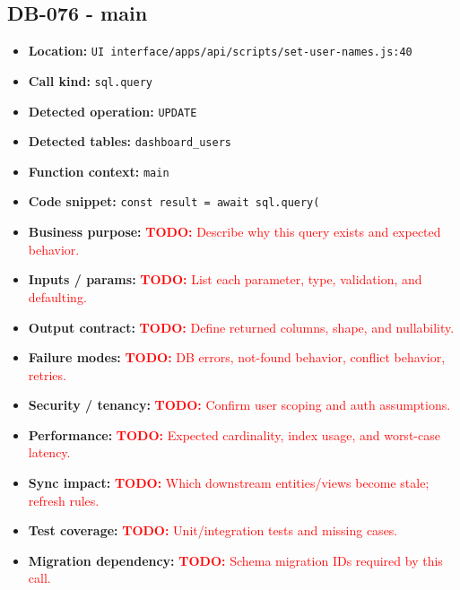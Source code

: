 \documentclass[11pt]{article}
\newcommand{\todoitem}[1]{\textcolor{red}{\textbf{TODO:} #1}}
\begin{document}
\subsection{DB-076 - main}
\begin{itemize}[leftmargin=1.5em]
\item \textbf{Location:} \texttt{UI interface/apps/api/scripts/set-user-names.js:40}
\item \textbf{Call kind:} \texttt{sql.query}
\item \textbf{Detected operation:} \texttt{UPDATE}
\item \textbf{Detected tables:} \texttt{dashboard\_users}
\item \textbf{Function context:} \texttt{main}
\item \textbf{Code snippet:} \texttt{const result = await sql.query(}
\item \textbf{Business purpose:} \todoitem{Describe why this query exists and expected behavior.}
\item \textbf{Inputs / params:} \todoitem{List each parameter, type, validation, and defaulting.}
\item \textbf{Output contract:} \todoitem{Define returned columns, shape, and nullability.}
\item \textbf{Failure modes:} \todoitem{DB errors, not-found behavior, conflict behavior, retries.}
\item \textbf{Security / tenancy:} \todoitem{Confirm user scoping and auth assumptions.}
\item \textbf{Performance:} \todoitem{Expected cardinality, index usage, and worst-case latency.}
\item \textbf{Sync impact:} \todoitem{Which downstream entities/views become stale; refresh rules.}
\item \textbf{Test coverage:} \todoitem{Unit/integration tests and missing cases.}
\item \textbf{Migration dependency:} \todoitem{Schema migration IDs required by this call.}
\end{itemize}
\end{document}

